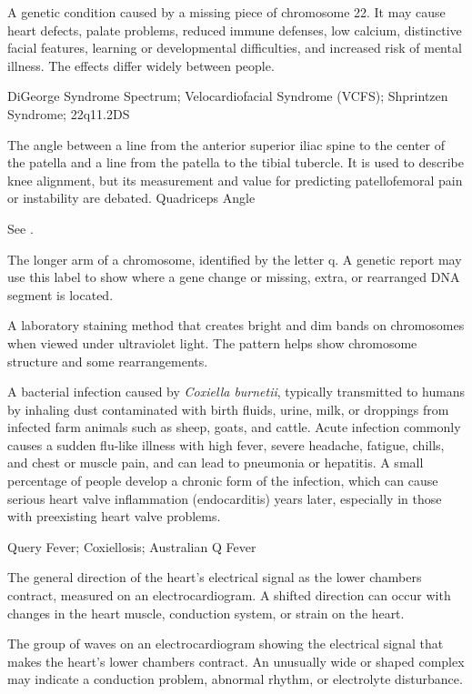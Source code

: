  A genetic condition caused by a missing piece of chromosome 22. It may cause heart defects, palate problems, reduced immune defenses, low calcium, distinctive facial features, learning or developmental difficulties, and increased risk of mental illness. The effects differ widely between people.

\synonyms
DiGeorge Syndrome Spectrum; Velocardiofacial Syndrome (VCFS); Shprintzen Syndrome; 22q11.2DS

 The angle between a line from the anterior superior iliac spine to the center of the patella and a line from the patella to the tibial tubercle. It is used to describe knee alignment, but its measurement and value for predicting patellofemoral pain or instability are debated.
\synonyms
Quadriceps Angle

 See .

 The longer arm of a chromosome, identified by the letter q. A genetic report may use this label to show where a gene change or missing, extra, or rearranged DNA segment is located.

 A laboratory staining method that creates bright and dim bands on chromosomes when viewed under ultraviolet light. The pattern helps show chromosome structure and some rearrangements.

 A bacterial infection caused by \textit{Coxiella burnetii}, typically transmitted to humans by inhaling dust contaminated with birth fluids, urine, milk, or droppings from infected farm animals such as sheep, goats, and cattle. Acute infection commonly causes a sudden flu-like illness with high fever, severe headache, fatigue, chills, and chest or muscle pain, and can lead to pneumonia or hepatitis. A small percentage of people develop a chronic form of the infection, which can cause serious heart valve inflammation (endocarditis) years later, especially in those with preexisting heart valve problems.

\synonyms
Query Fever; Coxiellosis; Australian Q Fever

 The general direction of the heart’s electrical signal as the lower chambers contract, measured on an electrocardiogram. A shifted direction can occur with changes in the heart muscle, conduction system, or strain on the heart.

 The group of waves on an electrocardiogram showing the electrical signal that makes the heart’s lower chambers contract. An unusually wide or shaped complex may indicate a conduction problem, abnormal rhythm, or electrolyte disturbance.

